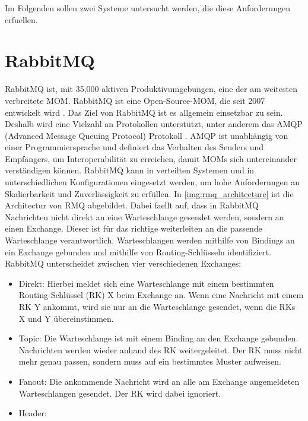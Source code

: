 Im Folgenden sollen zwei Systeme untersucht werden, die diese Anforderungen erfuellen.

\section{RabbitMQ}
RabbitMQ ist, mit 35,000 aktiven Produktivumgebungen, eine der am weitesten verbreitete MOM. 
RabbitMQ ist eine Open-Source-MOM, die seit 2007 entwickelt wird \cite{rabbitmq}. Das Ziel von RabbitMQ ist es allgemein einsetzbar zu sein. Deshalb wird eine Vielzahl an Protokollen unterstützt, unter anderem das AMQP (Advanced Message Queuing Protocol) Protokoll \cite{amqp}. AMQP ist unabhängig von einer Programmiersprache und definiert das Verhalten des Senders und Empfängers, um Interoperabilität zu erreichen, damit MOMs sich untereinander verständigen können. RabbitMQ kann in verteilten Systemen und in unterschiedlichen Konfigurationen eingesetzt werden, um hohe Anforderungen an Skalierbarkeit und Zuverlässigkeit zu erfüllen. In \autoref{img:rmq_architecture} ist die Architectur von RMQ abgebildet. Dabei faellt auf, dass in RabbitMQ Nachrichten nicht direkt an eine Warteschlange gesendet werden, sondern an einen Exchange. Dieser ist für das richtige weiterleiten an die passende Warteschlange verantwortlich. Warteschlangen werden mithilfe von Bindings an ein Exchange gebunden und mithilfe von Routing-Schlüsseln identifiziert. RabbitMQ unterscheidet zwischen vier verschiedenen Exchanges:
\begin{itemize}
    \item Direkt: Hierbei meldet sich eine Warteschlange mit einem bestimmten Routing-Schlüssel (RK) X beim Exchange an. Wenn eine Nachricht mit einem RK Y ankommt, wird sie nur an die Warteschlange gesendet, wenn die RKs X und Y übereinstimmen.
    \item Topic: Die Warteschlange ist mit einem Binding an den Exchange gebunden. Nachrichten werden wieder anhand des RK weitergeleitet. Der RK muss nicht mehr genau passen, sondern muss auf ein bestimmtes Muster aufweisen.
    \item Fanout: Die ankommende Nachricht wird an alle am Exchange angemeldeten Warteschlangen gesendet. Der RK wird dabei ignoriert.
    \item Header:
\end{itemize}
